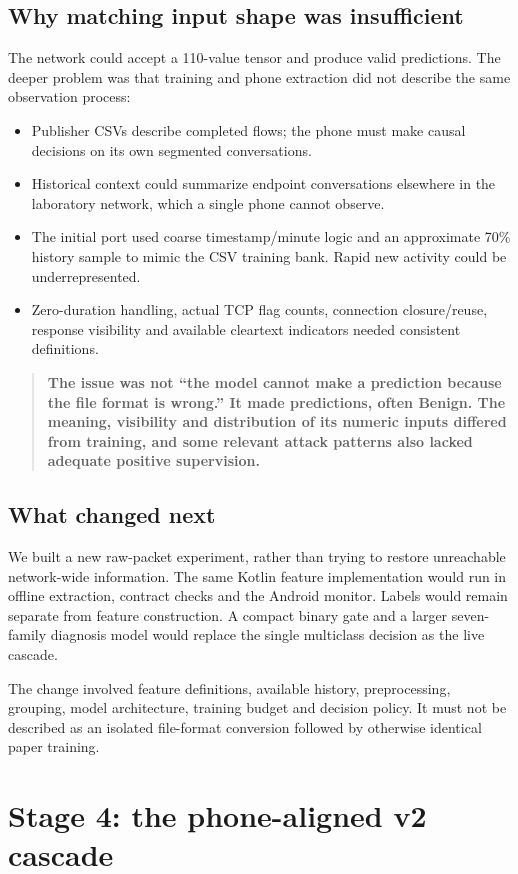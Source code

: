 \documentclass[11pt,a4paper,oneside]{report}
\newcommand{\important}[1]{\begin{quote}\color{blue!45!black}\textbf{#1}\end{quote}}
\begin{document}
\section{Why matching input shape was insufficient}
The network could accept a 110-value tensor and produce valid predictions. The deeper problem was that training and phone extraction did not describe the same observation process:
\begin{itemize}
\item Publisher CSVs describe completed flows; the phone must make causal decisions on its own segmented conversations.
\item Historical context could summarize endpoint conversations elsewhere in the laboratory network, which a single phone cannot observe.
\item The initial port used coarse timestamp/minute logic and an approximate 70\% history sample to mimic the CSV training bank. Rapid new activity could be underrepresented.
\item Zero-duration handling, actual TCP flag counts, connection closure/reuse, response visibility and available cleartext indicators needed consistent definitions.
\end{itemize}
\important{The issue was not ``the model cannot make a prediction because the file format is wrong.'' It made predictions, often Benign. The meaning, visibility and distribution of its numeric inputs differed from training, and some relevant attack patterns also lacked adequate positive supervision.}

\section{What changed next}
We built a new raw-packet experiment, rather than trying to restore unreachable network-wide information. The same Kotlin feature implementation would run in offline extraction, contract checks and the Android monitor. Labels would remain separate from feature construction. A compact binary gate and a larger seven-family diagnosis model would replace the single multiclass decision as the live cascade.

The change involved feature definitions, available history, preprocessing, grouping, model architecture, training budget and decision policy. It must not be described as an isolated file-format conversion followed by otherwise identical paper training.

\chapter{Stage 4: the phone-aligned v2 cascade}
\end{document}
